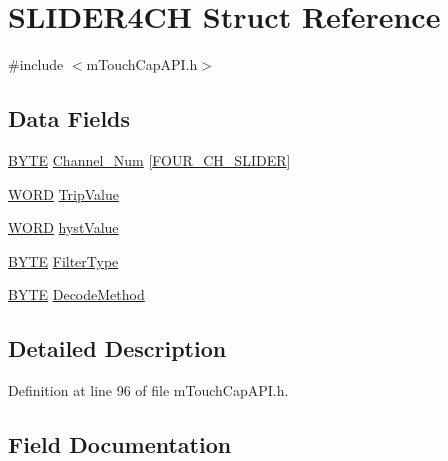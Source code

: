 \hypertarget{struct_s_l_i_d_e_r4_c_h}{}\section{S\+L\+I\+D\+E\+R4\+C\+H Struct Reference}
\label{struct_s_l_i_d_e_r4_c_h}


{\ttfamily \#include $<$m\+Touch\+Cap\+A\+P\+I.\+h$>$}

\subsection*{Data Fields}
\begin{DoxyCompactItemize}
\item 
\hyperlink{_generic_type_defs_8h_a4ae1dab0fb4b072a66584546209e7d58}{B\+Y\+T\+E} \hyperlink{struct_s_l_i_d_e_r4_c_h_acee864b15d8e08cf361094031b626959}{Channel\+\_\+\+Num} \mbox{[}\hyperlink{m_touch_cap_a_p_i_8h_aa65529aaa37673b011963784a1a0cac6}{F\+O\+U\+R\+\_\+\+C\+H\+\_\+\+S\+L\+I\+D\+E\+R}\mbox{]}
\item 
\hyperlink{_generic_type_defs_8h_a2b0e863dadf920709ec53d9088ee7c91}{W\+O\+R\+D} \hyperlink{struct_s_l_i_d_e_r4_c_h_abc6bec2968b498197fc0e64c3729fb0c}{Trip\+Value}
\item 
\hyperlink{_generic_type_defs_8h_a2b0e863dadf920709ec53d9088ee7c91}{W\+O\+R\+D} \hyperlink{struct_s_l_i_d_e_r4_c_h_aee26e696540c8197e148cb9f0ccd4551}{hyst\+Value}
\item 
\hyperlink{_generic_type_defs_8h_a4ae1dab0fb4b072a66584546209e7d58}{B\+Y\+T\+E} \hyperlink{struct_s_l_i_d_e_r4_c_h_a3ed3b2bb276c531333666858f705a254}{Filter\+Type}
\item 
\hyperlink{_generic_type_defs_8h_a4ae1dab0fb4b072a66584546209e7d58}{B\+Y\+T\+E} \hyperlink{struct_s_l_i_d_e_r4_c_h_a3ec50eb50f016432fd63460deb50d4d3}{Decode\+Method}
\end{DoxyCompactItemize}


\subsection{Detailed Description}


Definition at line 96 of file m\+Touch\+Cap\+A\+P\+I.\+h.



\subsection{Field Documentation}
\hypertarget{struct_s_l_i_d_e_r4_c_h_acee864b15d8e08cf361094031b626959}{}
